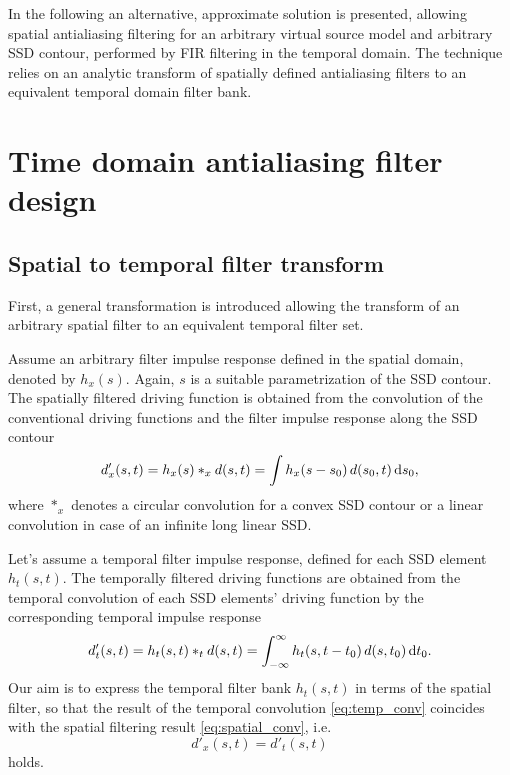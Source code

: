 \documentclass[conference]{IEEEtran}
\begin{document}
In the following an alternative, approximate solution is presented, allowing spatial antialiasing filtering for an arbitrary virtual source model and arbitrary SSD contour, performed by FIR filtering in the temporal domain.
The technique relies on an analytic transform of spatially defined antialiasing filters to an equivalent temporal domain filter bank.

\section{Time domain antialiasing filter design}

\subsection{Spatial to temporal filter transform}
First, a general transformation is introduced allowing the transform of an arbitrary spatial filter to an equivalent temporal filter set.

Assume an arbitrary filter impulse response defined in the spatial domain, denoted by $h_x(s)$.
Again, $s$ is a suitable parametrization of the SSD contour.
The spatially filtered driving function is obtained from the convolution of the conventional driving functions and the filter impulse response along the SSD contour
\begin{equation}
    d'_x(s,t) = h_x(s) \ast_x d(s,t) = \int h_x(s-s_0) \, d(s_0,t) \, \td s_0,
    \label{eq:spatial_conv}
\end{equation}
where $\ast_x$ denotes a circular convolution for a convex SSD contour or a linear convolution in case of an infinite long linear SSD.

Let's assume a temporal filter impulse response, defined for each SSD element $h_t(s,t)$.
The temporally filtered driving functions are obtained from the temporal convolution of each SSD elements' driving function by the corresponding temporal impulse response
\begin{equation}
    d'_t(s,t) = h_t(s,t) \ast_t d(s,t) = \int_{-\infty}^{\infty} h_t(s,t-t_0) \, d(s,t_0) \, \td t_0.
    \label{eq:temp_conv}
\end{equation}
Our aim is to express the temporal filter bank $h_t(s,t)$ in terms of the spatial filter, so that the result of the temporal convolution \eqref{eq:temp_conv} coincides with the spatial filtering result \eqref{eq:spatial_conv}, i.e.
\begin{equation}
    d'_x(s,t) = d'_t(s,t)
\end{equation}
holds.
\end{document}

